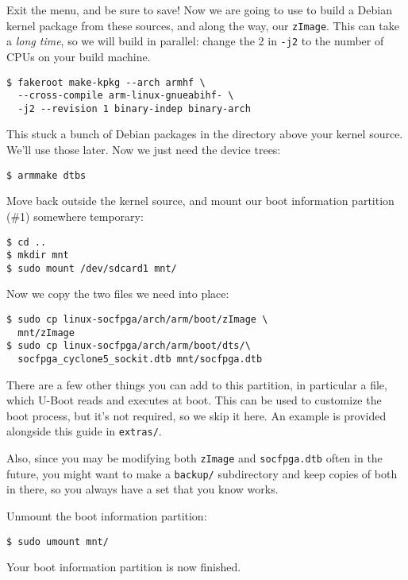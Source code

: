 \documentclass{sockitguide}
\begin{document}
Exit the menu, and be sure to save! Now we are going to use
 to build
a Debian kernel package from these sources, and along the way, our
\texttt{zImage}. This can take a \textit{long time}, so we will build
in parallel: change the 2 in \texttt{-j2} to the number of
CPUs on your build machine.

\begin{verbatim}
$ fakeroot make-kpkg --arch armhf \
  --cross-compile arm-linux-gnueabihf- \
  -j2 --revision 1 binary-indep binary-arch
\end{verbatim}

This stuck a bunch of Debian packages in the directory above your kernel
source. We'll use those later. Now we just need the device trees:
\begin{verbatim}
$ armmake dtbs
\end{verbatim}

Move back outside the kernel source, and mount our boot information
partition (\#1) somewhere temporary:
\begin{verbatim}
$ cd ..
$ mkdir mnt
$ sudo mount /dev/sdcard1 mnt/
\end{verbatim}

Now we copy the two files we need into place:
\begin{verbatim}
$ sudo cp linux-socfpga/arch/arm/boot/zImage \
  mnt/zImage
$ sudo cp linux-socfpga/arch/arm/boot/dts/\
  socfpga_cyclone5_sockit.dtb mnt/socfpga.dtb
\end{verbatim}

There are a few other things you can add to this partition, in
particular a
file, which U-Boot reads and executes at boot. This can be used to
customize the boot process, but it's not required, so we skip it
here. An example is provided alongside this guide in \texttt{extras/}.

Also, since you may be modifying both \texttt{zImage} and
\texttt{socfpga.dtb} often in the future, you might want to make a
\texttt{backup/} subdirectory and keep copies of both in there, so you
always have a set that you know works.

Unmount the boot information partition:
\begin{verbatim}
$ sudo umount mnt/
\end{verbatim}

Your boot information partition is now finished.
\end{document}
